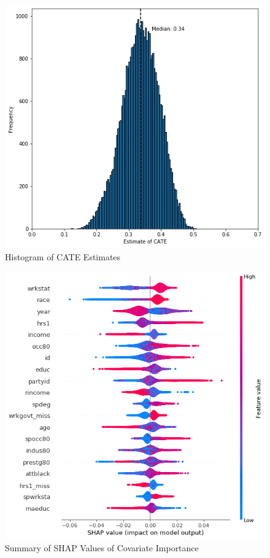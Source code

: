 \documentclass[12pt]{article}
\begin{document}
\begin{figure}[h]
\caption{Histogram of CATE Estimates}
	\centering
   	 	\includegraphics[width = 0.6\linewidth]{Graphs/s1_catefreq.png}
\end{figure} 

\begin{figure}[h]
\caption{Summary of SHAP Values of Covariate Importance}
	\centering
   	 	\includegraphics[width = 0.6\linewidth]{Graphs/s1_shap.png}
\end{figure} 
\end{document}
